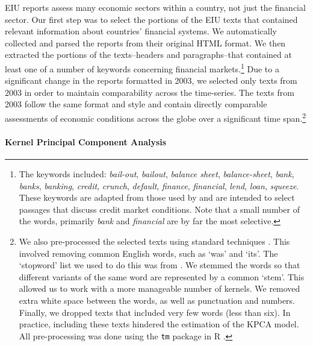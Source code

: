 \documentclass[]{article}
\begin{document}
EIU reports assess many economic sectors within a country,
not just the financial sector.
Our first step was to select the portions of the EIU texts that contained relevant information about countries' financial systems. We automatically collected and parsed the reports from their original HTML format. We then extracted the portions of the texts--headers and paragraphs--that contained at least one of a number of keywords concerning financial markets.\footnote{The
  keywords included: \emph{bail-out}, \emph{bailout}, \emph{balance
  sheet}, \emph{balance-sheet}, \emph{bank}, \emph{banks},
  \emph{banking}, \emph{credit}, \emph{crunch}, \emph{default},
  \emph{finance}, \emph{financial}, \emph{lend}, \emph{loan},
  \emph{squeeze}. These keywords are adapted
  from those used by \cite{Romer2015} and are intended to
  select passages that discuss credit market conditions. Note that a small number of the words, primarily \emph{bank} and \emph{financial} are by far the most selective.} Due to a significant change in the reports formatted in 2003, we selected only texts from 2003 in order to maintain comparability across the time-series. The texts from 2003 follow the same format and style and contain directly comparable assessments of economic conditions across the globe over a significant time span.\footnote{We also pre-processed the selected texts using standard techniques \citep[see][]{Grimmer2013}. This involved removing common English words, such as `was' and `its'. The `stopword' list we used to do this was from \cite{dhillon:modha:mlj01}. We stemmed the words so that different variants of the same word are represented by a common `stem'. This allowed us to work with a more manageable number of kernels. We removed extra white space between the words, as well as punctuation and numbers. Finally, we dropped texts that included very few words (less than six). In practice, including these texts hindered the estimation of the KPCA model. All pre-processing was done using the \texttt{tm} package \citep{tm2015} in R \citep{R-cite}.}

\paragraph{Kernel Principal Component
Analysis}\label{kernel-principal-component-analysis}
\end{document}
